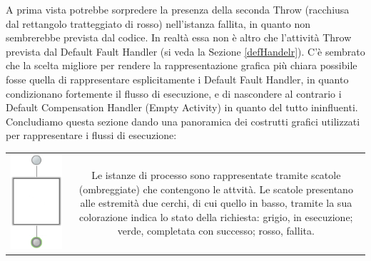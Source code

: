 A prima vista potrebbe sorpredere la presenza della seconda Throw (racchiusa
dal rettangolo tratteggiato di rosso) nell'istanza fallita, in quanto non
sembrerebbe prevista dal codice. In realtà essa non è altro che l'attività
Throw prevista dal Default Fault Handler (si veda la Sezione \ref{defHandelr}).
C'è sembrato che la scelta migliore per rendere la rappresentazione grafica più chiara possibile fosse
quella di rappresentare esplicitamente i Default Fault Handler, in quanto
condizionano fortemente il flusso di esecuzione, e di nascondere al contrario i
Default Compensation Handler (Empty Activity) in quanto del tutto ininfluenti.
\\

Concludiamo questa sezione dando una panoramica dei costrutti grafici utilizzati
per rappresentare i flussi di esecuzione:

\begin{tabular}{c  c}
\parbox[c][5cm][c]{0.2 \textwidth}
{\includegraphics[scale=0.48]{blide/dia/BlideInst}} &
\parbox[c][5cm][c]{0.6 \textwidth}{Le istanze di processo
sono rappresentate tramite scatole (ombreggiate) che contengono le attvità.
Le scatole presentano alle estremità due cerchi, di cui quello in basso,
tramite la sua colorazione indica lo stato della richiesta: grigio, in
esecuzione; verde, completata con successo; rosso, fallita.}\\
\end{tabular}

